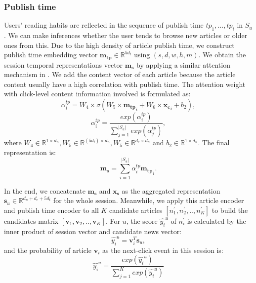 \subsubsection{Publish time}
Users' reading habits are reflected in the sequence of publish time ${tp_1,...,tp_i}$ in $S_u$. We can make inferences whether the user tends to browse new articles or older ones from this. Due to the high density of article publish time, we construct publish time embedding vector $\mathbf{m_{tp}}\in \mathbb{R}^{5d_t}$ using $(s, d, w, h, m)$. We obtain the session temporal representations vector $\mathbf{m_s}$ by applying a similar attention mechanism in . We add the content vector of each article because the article content usually have a high correlation with publish time. The attention weight with click-level content information involved is formulated as:
\begin{equation}
    \alpha_i^{tp} = W_4 \times \sigma (W_5 \times \mathbf{m_{tp}}_i + W_6 \times \mathbf{x_c}_i + b_2),
\end{equation}
\begin{equation}
    \alpha_i^{tp} = \frac{exp(\alpha_i^{tp})}{\sum_{j=1}^{|S_u|}exp(\alpha_j^{tp})},
\end{equation}
where $W_4\in \mathbb{R}^{1 \times d_n}, W_5 \in \mathbb{R}^{(5d_t)\times d_n}, W_5 \in \mathbb{R}^{d_c\times d_n}$ and $b_2 \in \mathbb{R}^{1 \times d_n}$. The final representation is:
\begin{equation}
    \mathbf{m_s} = \sum_{i=1}^{|S_u|} \alpha_i^{tp} \mathbf{m_{tp}}_i.
\end{equation}

In the end, we concatenate $\mathbf{m_s}$ and $\mathbf{x_s}$ as the aggregated representation $\mathbf{s}_u \in \mathbb{R}^{d_n+d_c+5d_t} $ for the whole session. Meanwhile, we apply this article encoder and publish time encoder to all $K$ candidate articles $[n_1^{\prime}, n_2^{\prime},.., n_K^{\prime}]$ to build the candidates matrix $[\mathbf{v}_1, \mathbf{v}_2,.., \mathbf{v}_K]$. For $u$, the score $\hat{y_i}^u$ of $n_i^{\prime}$ is calculated by the inner product of session vector and candidate news vector:
\begin{equation}
    \hat{y_i}^u = \mathbf{v}_i^T\mathbf{s}_u, 
\end{equation}
and the probability of article $\mathbf{v}_i$ as the next-click event in this session is:
\begin{equation}
    \hat{y_i}^u = \frac{exp(\hat{y_i}^u)}{\sum_{j=1}^K exp(\hat{y_i}^u)}
\end{equation}

